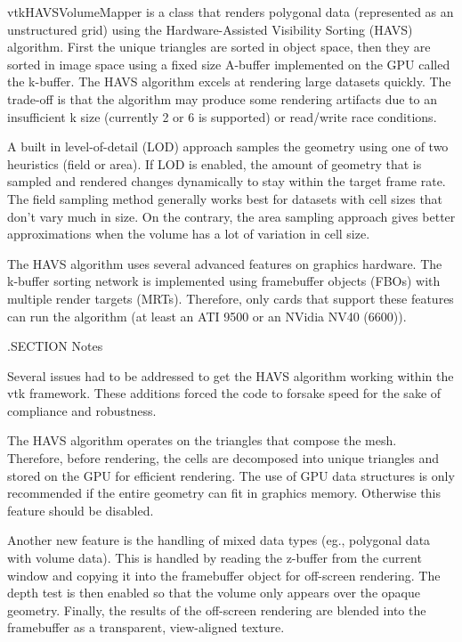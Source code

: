 vtk\-H\-A\-V\-S\-Volume\-Mapper is a class that renders polygonal data (represented as an unstructured grid) using the Hardware-\/\-Assisted Visibility Sorting (H\-A\-V\-S) algorithm. First the unique triangles are sorted in object space, then they are sorted in image space using a fixed size A-\/buffer implemented on the G\-P\-U called the k-\/buffer. The H\-A\-V\-S algorithm excels at rendering large datasets quickly. The trade-\/off is that the algorithm may produce some rendering artifacts due to an insufficient k size (currently 2 or 6 is supported) or read/write race conditions.

A built in level-\/of-\/detail (L\-O\-D) approach samples the geometry using one of two heuristics (field or area). If L\-O\-D is enabled, the amount of geometry that is sampled and rendered changes dynamically to stay within the target frame rate. The field sampling method generally works best for datasets with cell sizes that don't vary much in size. On the contrary, the area sampling approach gives better approximations when the volume has a lot of variation in cell size.

The H\-A\-V\-S algorithm uses several advanced features on graphics hardware. The k-\/buffer sorting network is implemented using framebuffer objects (F\-B\-Os) with multiple render targets (M\-R\-Ts). Therefore, only cards that support these features can run the algorithm (at least an A\-T\-I 9500 or an N\-Vidia N\-V40 (6600)).

.S\-E\-C\-T\-I\-O\-N Notes

Several issues had to be addressed to get the H\-A\-V\-S algorithm working within the vtk framework. These additions forced the code to forsake speed for the sake of compliance and robustness.

The H\-A\-V\-S algorithm operates on the triangles that compose the mesh. Therefore, before rendering, the cells are decomposed into unique triangles and stored on the G\-P\-U for efficient rendering. The use of G\-P\-U data structures is only recommended if the entire geometry can fit in graphics memory. Otherwise this feature should be disabled.

Another new feature is the handling of mixed data types (eg., polygonal data with volume data). This is handled by reading the z-\/buffer from the current window and copying it into the framebuffer object for off-\/screen rendering. The depth test is then enabled so that the volume only appears over the opaque geometry. Finally, the results of the off-\/screen rendering are blended into the framebuffer as a transparent, view-\/aligned texture.

